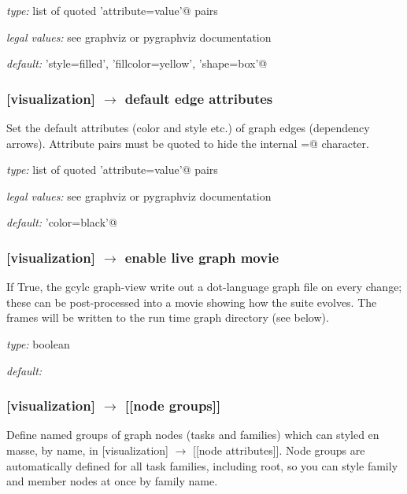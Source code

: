 \begin{myitemize}
    \item {\em type:} list of quoted \lstinline@'attribute=value'@ pairs
    \item {\em legal values:} see graphviz or pygraphviz documentation
    \item {\em default:} \lstinline@'style=filled', 'fillcolor=yellow', 'shape=box'@
\end{myitemize}

\subsubsection[default edge attributes]{[visualization] $\rightarrow$ default edge attributes}

Set the default attributes (color and style etc.) of graph edges
(dependency arrows).  Attribute pairs must be quoted to hide the
internal \lstinline@=@ character.
\begin{myitemize}
    \item {\em type:} list of quoted \lstinline@'attribute=value'@ pairs
    \item {\em legal values:} see graphviz or pygraphviz documentation
    \item {\em default:} \lstinline@'color=black'@
\end{myitemize}

\subsubsection[enable live graph movie]{[visualization] $\rightarrow$ enable live graph movie}

If True, the gcylc graph-view write out a dot-language graph file on
every change; these can be post-processed into a movie
showing how the suite evolves. The frames will be written to the run
time graph directory (see below).

\begin{myitemize}
    \item {\em type:} boolean
    \item {\em default:} \lstinline@False@
\end{myitemize}

\subsubsection[{[[}node groups{]]}]{[visualization] $\rightarrow$ [[node groups]]}

Define named groups of graph nodes (tasks and families) which can styled
en masse, by name, in [visualization] $\rightarrow$ [[node attributes]].
Node groups are automatically defined for all task families, including
root, so you can style family and member nodes at once by family name.

